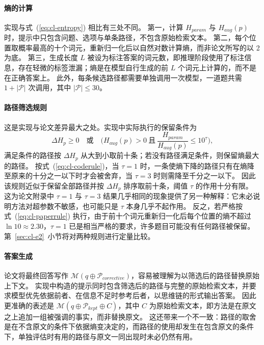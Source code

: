 \paragraph{熵的计算}
实现与式~(\ref{eq:cl-entropy}) 相比有三处不同。
第一，计算 $H_{param}$ 与 $H_{aug}(p)$ 时，提示中只包含问题、选项与单条路径，不包含原始检索文本。
第二，每个位置取概率最高的十个词元，重新归一化后以自然对数计算熵，而非论文所写的以 2 为底。
第三，生成长度 $L$ 被设为标注答案的词元数，即推理阶段使用了标注信息，存在轻微的标签泄漏；熵是在模型自行生成的前 $L$ 个词元上计算的，而不是在正确答案上。
此外，每条候选路径都需要单独调用一次模型，一道题共需 $1+|\mathcal{P}|$ 次调用，其中 $|\mathcal{P}|\le 30$。

\paragraph{路径筛选规则}
这是实现与论文差异最大之处。实现中实际执行的保留条件为
\begin{equation}
  \Delta H_p \ge 0
  \quad\text{或}\quad
  \Big( H_{aug}(p)>0 \ \text{且}\ \frac{H_{param}}{H_{aug}(p)} \le 10^{\tau} \Big),
  \label{eq:cl-coderule}
\end{equation}
满足条件的路径按 $\Delta H_p$ 从大到小取前十条；若没有路径满足条件，则保留熵最大的路径。
按式~(\ref{eq:cl-coderule})，当 $\tau=1$ 时，一条使熵下降的路径只有在熵降至原来的十分之一以下时才会被舍弃，当 $\tau=3$ 时则需降至千分之一以下。
因此该规则近似于保留全部路径并按 $\Delta H_p$ 排序取前十条，阈值 $\tau$ 的作用十分有限。
这为论文附录中 $\tau=1$ 与 $\tau=3$ 结果几乎相同的现象提供了另一种解释：它未必说明方法对超参数不敏感，也可能只是 $\tau$ 本身几乎不起作用。
反之，若严格按式~(\ref{eq:cl-paperrule}) 执行，由于前十个词元重新归一化后每个位置的熵不超过 $\ln 10\approx 2.30$，$\tau=1$ 已是相当严格的要求，许多题目可能没有任何路径被保留。
第~\ref{sec:cl-e2}~小节将对两种规则进行定量比较。

\paragraph{答案生成}
论文将最终回答写作 $\mathcal{M}(q\oplus\mathcal{P}_{corrective})$，容易被理解为以筛选后的路径替换原始上下文。
实现中构造的提示同时包含筛选后的路径与完整的原始检索文本，并要求模型优先依据前者、在信息不足时参考后者，以思维链的形式输出答案。
因此更准确的表述是 $\mathcal{M}(q\oplus\mathcal{P}_{kept}\oplus C)$，其中 $C$ 为原始检索文本，即方法是在原文之上追加一组被强调的事实，而非替换原文。
这还带来一个不一致：路径的取舍是在不含原文的条件下依据熵变决定的，而路径的使用却发生在包含原文的条件下，单独评估时有用的路径与原文一同出现时未必仍然有用。

